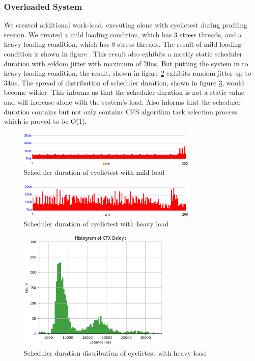 \documentclass[conference]{IEEEtran}
\begin{document}
\subsubsection{Overloaded System}

    We created additional work-load, executing alone with cyclictest during profiling session. We created a mild loading
    condition, which has 3 stress threads, and a heavy loading condition, which has 8 stress threads. The result of mild
    loading condition is shown in figure \label{fig:sd_mild}. This result also exhibits a mostly static scheduler
    duration with seldom jitter with maximum of 20us. But putting the system in to heavy loading condition, the result,
    shown in figure \ref{fig:sd_heavy} exhibits random jitter up to 34us. The spread of distribution of scheduler
    duration, shown in figure \ref{fig:sd_heavy_d}, would become wilder. This informs us that the scheduler duration is
    not a static value and will increase alone with the system's load. Also informs that the scheduler duration contains
    but not only contains CFS algorithm task selection process which is proved to be O(1).

    \begin{figure} \centering \includegraphics[width=3.5in]{img/sd-mild.png} \caption{Scheduler duration of cyclictest
    with mild load} \label{fig:sd_mild} \end{figure}

    \begin{figure} \centering \includegraphics[width=3.5in]{img/sd-heavy.png} \caption{Scheduler duration of cyclictest
    with heavy load} \label{fig:sd_heavy} \end{figure}

    \begin{figure} \centering \includegraphics[width=3in]{img/sd-heavy-d.png} \caption{Scheduler duration distribution
    of cyclictest with heavy load} \label{fig:sd_heavy_d} \end{figure}
\end{document}
